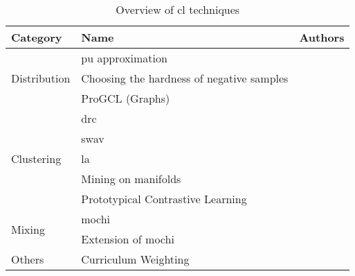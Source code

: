 \documentclass[runningheads]{llncs}
\begin{document}
\begin{table}[]
    \caption{Overview of \acs{cl} techniques}
    \label{tab:overview}
    \begin{tabular}{|l|l|l|}
    \hline
    \textbf{Category}                                   & \textbf{Name}                             & \textbf{Authors} \\ \hline
    \multicolumn{1}{|c|}{\multirow{3}{*}{Distribution}} & \acs{pu} approximation                          & \citet{chuang_debiased_2020}                \\ \cline{2-3} 
    \multicolumn{1}{|c|}{}                              & Choosing the hardness of negative samples     & \citet{robinson_contrastive_2021}                \\ \cline{2-3} 
    \multicolumn{1}{|c|}{}                              & ProGCL (Graphs)                               & \citet{progcl_2022}                \\ \hline
    \multirow{5}{*}{Clustering}                         & \acs{drc}                                       & \citet{DRC_2020}                \\ \cline{2-3} 
                                                        & \acs{swav}                                      & \citet{swav_2020}                \\ \cline{2-3} 
                                                        & \acs{la}                                       & \citet{local_aggr_2019}                \\ \cline{2-3} 
                                                        & Mining on manifolds                           & \citet{mining_manifolds_2018}                \\ \cline{2-3} 
                                                        & Prototypical Contrastive Learning             & \citet{PCL_2021}               \\ \hline
    \multirow{2}{*}{Mixing}                             & \acs{mochi}                                     & \citet{mochi_2020}                \\ \cline{2-3} 
                                                        & Extension of \acs{mochi}                        & \citet{progcl_2022}                \\ \hline
    Others                                              & Curriculum Weighting                          & \citet{curricular_weighting_2024}               \\ \hline
    \end{tabular}
    \end{table}
\end{document}
